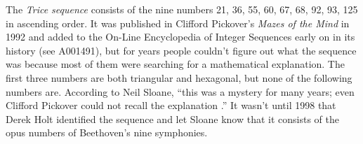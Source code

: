 \documentclass[12pt]{article}
\begin{document}
The {\em Trice sequence} consists of the nine numbers 21, 36, 55, 60, 67, 68, 92, 93, 125 in ascending order. It was published in Clifford Pickover's {\it Mazes of the Mind} in 1992 and added to the On-Line Encyclopedia of Integer Sequences early on in its history (see A001491), but for years people couldn't figure out what the sequence was because most of them were searching for a mathematical explanation. The first three numbers are both triangular and hexagonal, but none of the following numbers are. According to Neil Sloane, ``this was a mystery for many years; even Clifford Pickover could not recall the explanation .'' It wasn't until 1998 that Derek Holt identified the sequence and let Sloane know that it consists of the opus numbers of Beethoven's nine symphonies.
\end{document}
